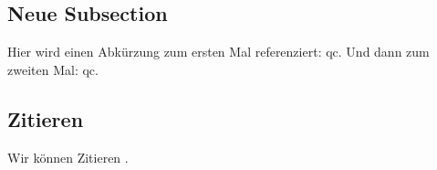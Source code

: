 \subsection*{Neue Subsection}

Hier wird einen Abkürzung zum ersten Mal referenziert: \ac{qc}. Und dann zum zweiten Mal: \ac{qc}.

\subsection{Zitieren}

Wir können Zitieren \cite{pohlmann_quantensichere_2019}.